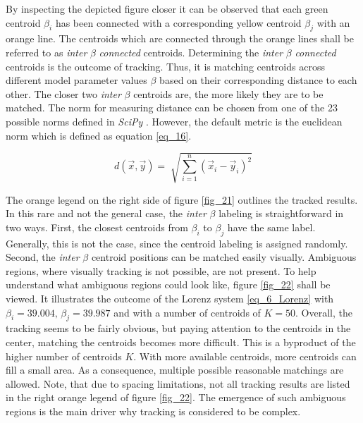 By inspecting the depicted figure closer it can be observed that each green centroid $\beta_i$ has been connected with a corresponding yellow centroid $\beta_j$ with an orange line. 
The centroids which are connected through the orange lines shall be referred to as \emph{inter} $\beta$ \emph{connected} centroids. 
Determining the \emph{inter} $\beta$ \emph{connected} centroids is the outcome of tracking. Thus, it is matching centroids across different model parameter values $\beta$ based on their corresponding distance to each other. The closer two \emph{inter} $\beta $ centroids are, the more likely they are to be matched. 
The norm for measuring distance can be chosen from 
one of the 23 possible norms defined in \emph{SciPy} \cite{2020SciPy-NMeth}. 
However, the default metric is the euclidean norm which is defined as equation \eqref{eq_16}.\newline

 \begin{equation}
     \label{eq_16}
     d(\vec x, \vec y) = \sqrt[]{\sum_{i=1}^n \left(\vec{x}_i - \vec{y}_i\right)^2}
 \end{equation}

\vspace{0.2cm}
The orange legend on the right side of figure \ref{fig_21} outlines the tracked results.
In this rare and not the general case, the \emph{inter} $\beta$ labeling is straightforward in two ways. First, the closest centroids from $\beta_i$ to $\beta_j$ have the same label. Generally, this is not the case, since the centroid labeling is assigned randomly.
Second, the \emph{inter} $\beta$ centroid positions can be matched easily visually. 
Ambiguous regions, where visually tracking is not possible, are not present.
To help understand what ambiguous regions could look like, figure \ref{fig_22} shall be viewed. It illustrates the outcome of the Lorenz system \eqref{eq_6_Lorenz} with $\beta_i=39.004,\, \beta_j = 39.987$ and with a number of centroids of $K= 50$.
Overall, the tracking seems to be fairly obvious, but paying attention to the centroids in the center, matching the centroids becomes more difficult. 
This is a byproduct of the higher number of centroids $K$. 
With more available centroids, more centroids can fill a small area.
As a consequence, multiple possible reasonable matchings are allowed.
Note, that due to spacing limitations, not all tracking results are listed in the right orange legend of figure \ref{fig_22}. 
The emergence of such ambiguous regions is the main driver why tracking is considered to be complex.\newline

